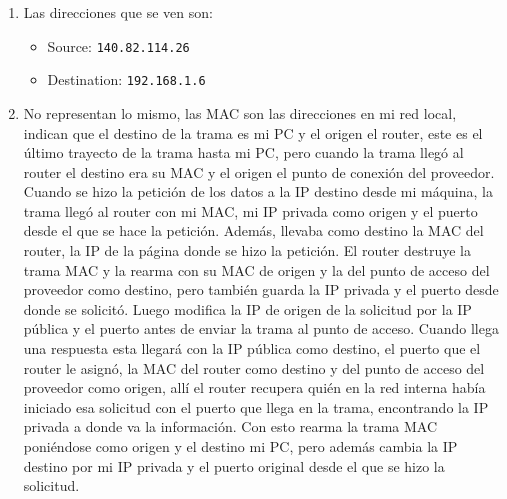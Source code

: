 \documentclass[11pt,a4paper]{article}
\begin{document}
\begin{enumerate}
\begin{enumerate}
        Mediante \texttt{ip link show}, se reconoce que
        \texttt{74:c6:3b:2d:48:0f} es el identificador de la placa Wi-Fi de la
        PC. Haciendo una validación de las redes inalámbricas con
        \texttt{nmcli -f ACTIVE,SSID,BSSID dev wifi list}, se reconoce
        \texttt{64:fd:96:c7:0b:77} como el identificador del punto de acceso
        Wi-Fi.
      \item Las direcciones que se ven son:
        \begin{itemize}
          \item Source: \texttt{140.82.114.26}
          \item Destination: \texttt{192.168.1.6}
        \end{itemize}
      \item No representan lo mismo, las MAC son las direcciones en mi red local,
        indican que el destino de la trama es mi PC y el origen el router, este es
        el último trayecto de la trama hasta mi PC, pero cuando la trama llegó al
        router el destino era su MAC y el origen el punto de conexión del proveedor.
        Cuando se hizo la petición de los datos a la IP destino desde mi máquina,
        la trama llegó al router con mi MAC, mi IP privada como origen y el puerto
        desde el que se hace la petición. Además, llevaba como destino la MAC del
        router, la IP de la página donde se hizo la petición. El router destruye la
        trama MAC y la rearma con su MAC de origen y la del punto de acceso del
        proveedor como destino, pero también guarda la IP privada y el puerto desde
        donde se solicitó. Luego modifica la IP de origen de la solicitud por la IP
        pública y el puerto antes de enviar la trama al punto de acceso. Cuando llega
        una respuesta esta llegará con la IP pública como destino, el puerto que el
        router le asignó, la MAC del router como destino y del punto de acceso del
        proveedor como origen, allí el router recupera quién en la red interna había
        iniciado esa solicitud con el puerto que llega en la trama, encontrando la
        IP privada a donde va la información. Con esto rearma la trama
        MAC poniéndose como origen y el destino mi PC, pero además cambia la IP
        destino por mi IP privada y el puerto original desde el que se hizo la
        solicitud.


\end{enumerate}
\end{enumerate}
\end{document}

